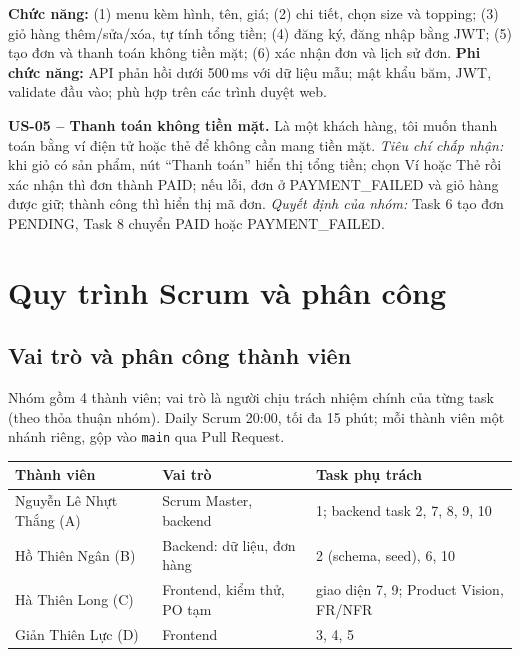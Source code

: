 \documentclass[a4paper]{article}
\begin{document}
\textbf{Chức năng:} (1) menu kèm hình, tên, giá; (2) chi tiết, chọn size và topping; (3) giỏ hàng thêm/sửa/xóa, tự tính tổng tiền; (4) đăng ký, đăng nhập bằng JWT; (5) tạo đơn và thanh toán không tiền mặt; (6) xác nhận đơn và lịch sử đơn. \textbf{Phi chức năng:} API phản hồi dưới 500\,ms với dữ liệu mẫu; mật khẩu băm, JWT, validate đầu vào; phù hợp trên các trình duyệt web.

\begin{mdframed}[hidealllines=true,backgroundcolor=green!8]
\small\textbf{US-05 -- Thanh toán không tiền mặt.} Là một khách hàng, tôi muốn thanh toán bằng ví điện tử hoặc thẻ để không cần mang tiền mặt. \textit{Tiêu chí chấp nhận:} khi giỏ có sản phẩm, nút ``Thanh toán'' hiển thị tổng tiền; chọn Ví hoặc Thẻ rồi xác nhận thì đơn thành PAID; nếu lỗi, đơn ở PAYMENT\_FAILED và giỏ hàng được giữ; thành công thì hiển thị mã đơn. \textit{Quyết định của nhóm:} Task 6 tạo đơn PENDING, Task 8 chuyển PAID hoặc PAYMENT\_FAILED.
\end{mdframed}

\section{Quy trình Scrum và phân công}
\subsection{Vai trò và phân công thành viên}
Nhóm gồm 4 thành viên; vai trò là người chịu trách nhiệm chính của từng task (theo thỏa thuận nhóm). Daily Scrum 20:00, tối đa 15 phút; mỗi thành viên một nhánh riêng, gộp vào \texttt{main} qua Pull Request.
\begin{center}
\small\everymath{}
\begin{tabular}{@{}p{3.7cm}p{3.7cm}p{6.2cm}@{}}
\toprule
\textbf{Thành viên} & \textbf{Vai trò} & \textbf{Task phụ trách} \\ \midrule
Nguyễn Lê Nhựt Thắng (A) & Scrum Master, backend & 1; backend task 2, 7, 8, 9, 10 \\
Hồ Thiên Ngân (B) & Backend: dữ liệu, đơn hàng & 2 (schema, seed), 6, 10 \\
Hà Thiên Long (C) & Frontend, kiểm thử, PO tạm & giao diện 7, 9; Product Vision, FR/NFR \\
Giản Thiên Lực (D) & Frontend & 3, 4, 5 \\
\bottomrule
\end{tabular}
\end{center}
\end{document}
